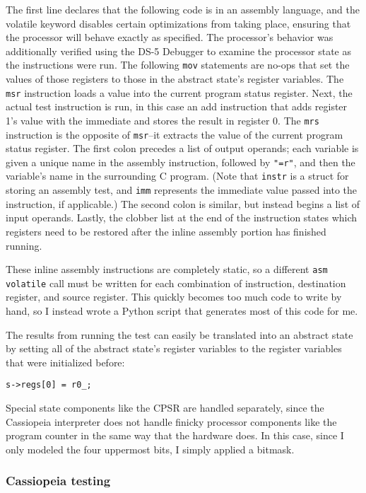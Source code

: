 \documentclass[letterpaper,12pt]{article}
\begin{document}
The first line declares that the following code is in an assembly language, and the volatile keyword disables certain optimizations from taking place, ensuring that the processor will behave exactly as specified. The processor's behavior was additionally verified using the DS-5 Debugger\cite{Debug} to examine the processor state as the instructions were run. The following \texttt{mov} statements are no-ops that set the values of those registers to those in the abstract state's register variables. The \texttt{msr} instruction loads a value into the current program status register. Next, the actual test instruction is run, in this case an add instruction that adds register 1's value with the immediate and stores the result in register 0. The \texttt{mrs} instruction is the opposite of \texttt{msr}--it extracts the value of the current program status register. The first colon precedes a list of output operands; each variable is given a unique name in the assembly instruction, followed by \texttt{"=r"}, and then the variable's name in the surrounding C program. (Note that \texttt{instr} is a struct for storing an assembly test, and \texttt{imm} represents the immediate value passed into the instruction, if applicable.) The second colon is similar, but instead begins a list of input operands. Lastly, the clobber list at the end of the instruction states which registers need to be restored after the inline assembly portion has finished running.

These inline assembly instructions are completely static, so a different \texttt{asm volatile} call must be written for each combination of instruction, destination register, and source register. This quickly becomes too much code to write by hand, so I instead wrote a Python script that generates most of this code for me.

The results from running the test can easily be translated into an abstract state by setting all of the abstract state's register variables to the register variables that were initialized before:

\texttt{s->regs[0] = r0\_;}

Special state components like the CPSR are handled separately, since the Cassiopeia interpreter does not handle finicky processor components like the program counter in the same way that the hardware does. In this case, since I only modeled the four uppermost bits, I simply applied a bitmask.

\subsubsection{Cassiopeia testing}
\end{document}
